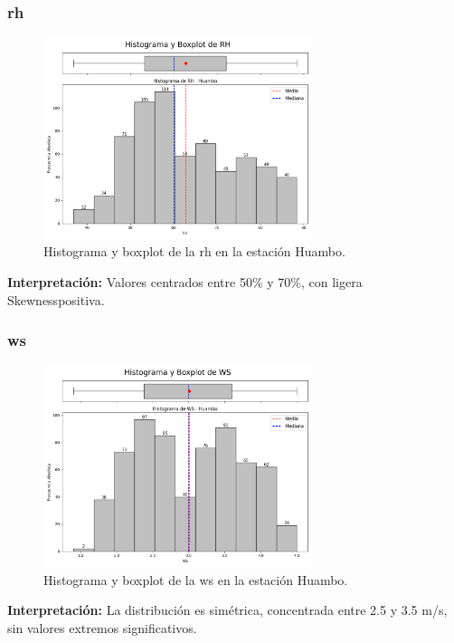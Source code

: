 \subsubsection*{\gls{rh} }
\begin{figure}[htbp]
\centering
\includegraphics[width=0.7\textwidth]{resultados/por_estacion_meteorologica/Huambo/RH_histograma.png}
\caption{Histograma y boxplot de la \gls{rh}  en la estación Huambo.}
\label{fig:huambo_RH}
\end{figure}
\textbf{Interpretación:} Valores centrados entre 50\% y 70\%, con ligera Skewnesspositiva.

\subsubsection*{\gls{ws} }
\begin{figure}[htbp]
\centering
\includegraphics[width=0.7\textwidth]{resultados/por_estacion_meteorologica/Huambo/WS_histograma.png}
\caption{Histograma y boxplot de la \gls{ws}  en la estación Huambo.}
\label{fig:huambo_WS}
\end{figure}
\textbf{Interpretación:} La distribución es simétrica, concentrada entre 2.5 y 3.5 m/s, sin valores extremos significativos.

